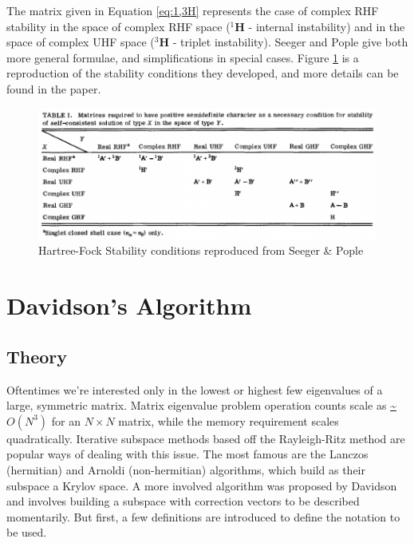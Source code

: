 \documentclass{revtex4}
\begin{document}
The matrix given in Equation \ref{eq:1,3H} represents the case of complex RHF stability in the space of complex RHF space (${}^{1}\mathbf{H}$ - internal instability) and in the space of complex UHF space (${}^{3}\mathbf{H}$ - triplet instability). Seeger and Pople \cite{Seeger1977} give both more general formulae, and simplifications in special cases. Figure \ref{fig:stability_table} is a reproduction of the stability conditions they developed, and more details can be found in the paper. 
\begin{figure}[h]
   \includegraphics[width=1.0\linewidth]{figures/seeger_stability.pdf}
  	\caption {Hartree-Fock Stability conditions reproduced from Seeger \& Pople \cite{Seeger1977}}
  	\label{fig:stability_table}
\end{figure} 

\section{Davidson's Algorithm}
\subsection{Theory}
Oftentimes we're interested only in the lowest or highest few eigenvalues of a large, symmetric matrix. Matrix eigenvalue problem operation counts scale as \url{~}$O(N^3)$ for an $N \times N$ matrix, while the memory requirement scales quadratically. Iterative subspace methods based off the Rayleigh-Ritz method are popular ways of dealing with this issue. The most famous are the Lanczos (hermitian) and Arnoldi (non-hermitian) algorithms, which build as their subspace a Krylov space. A more involved algorithm was proposed by Davidson\cite{Davidson1975} and involves building a subspace with correction vectors to be described momentarily. But first, a few definitions are introduced to define the notation to be used.
\end{document}
